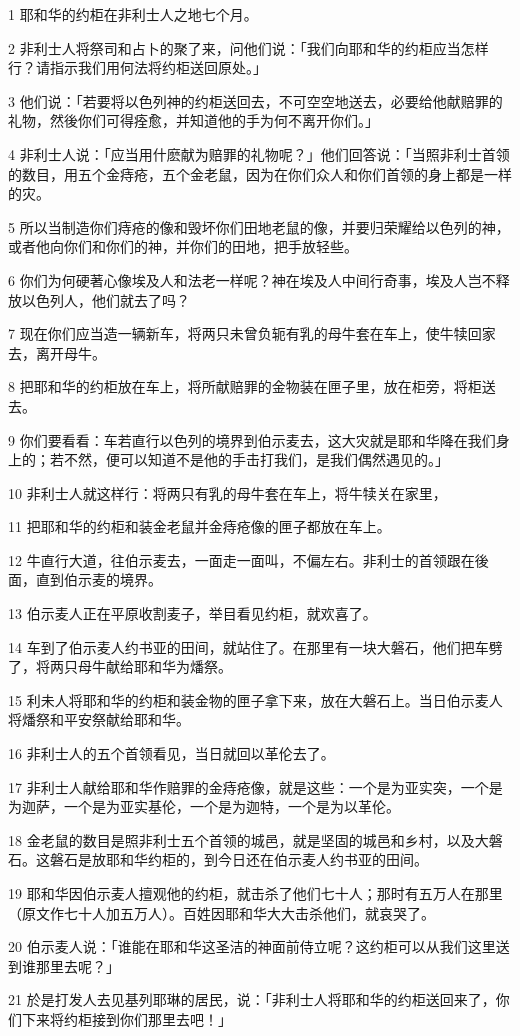 \par 1 耶和华的约柜在非利士人之地七个月。
\par 2 非利士人将祭司和占卜的聚了来，问他们说：「我们向耶和华的约柜应当怎样行？请指示我们用何法将约柜送回原处。」
\par 3 他们说：「若要将以色列神的约柜送回去，不可空空地送去，必要给他献赔罪的礼物，然後你们可得痊愈，并知道他的手为何不离开你们。」
\par 4 非利士人说：「应当用什麽献为赔罪的礼物呢？」他们回答说：「当照非利士首领的数目，用五个金痔疮，五个金老鼠，因为在你们众人和你们首领的身上都是一样的灾。
\par 5 所以当制造你们痔疮的像和毁坏你们田地老鼠的像，并要归荣耀给以色列的神，或者他向你们和你们的神，并你们的田地，把手放轻些。
\par 6 你们为何硬著心像埃及人和法老一样呢？神在埃及人中间行奇事，埃及人岂不释放以色列人，他们就去了吗？
\par 7 现在你们应当造一辆新车，将两只未曾负轭有乳的母牛套在车上，使牛犊回家去，离开母牛。
\par 8 把耶和华的约柜放在车上，将所献赔罪的金物装在匣子里，放在柜旁，将柜送去。
\par 9 你们要看看：车若直行以色列的境界到伯示麦去，这大灾就是耶和华降在我们身上的；若不然，便可以知道不是他的手击打我们，是我们偶然遇见的。」
\par 10 非利士人就这样行：将两只有乳的母牛套在车上，将牛犊关在家里，
\par 11 把耶和华的约柜和装金老鼠并金痔疮像的匣子都放在车上。
\par 12 牛直行大道，往伯示麦去，一面走一面叫，不偏左右。非利士的首领跟在後面，直到伯示麦的境界。
\par 13 伯示麦人正在平原收割麦子，举目看见约柜，就欢喜了。
\par 14 车到了伯示麦人约书亚的田间，就站住了。在那里有一块大磐石，他们把车劈了，将两只母牛献给耶和华为燔祭。
\par 15 利未人将耶和华的约柜和装金物的匣子拿下来，放在大磐石上。当日伯示麦人将燔祭和平安祭献给耶和华。
\par 16 非利士人的五个首领看见，当日就回以革伦去了。
\par 17 非利士人献给耶和华作赔罪的金痔疮像，就是这些：一个是为亚实突，一个是为迦萨，一个是为亚实基伦，一个是为迦特，一个是为以革伦。
\par 18 金老鼠的数目是照非利士五个首领的城邑，就是坚固的城邑和乡村，以及大磐石。这磐石是放耶和华约柜的，到今日还在伯示麦人约书亚的田间。
\par 19 耶和华因伯示麦人擅观他的约柜，就击杀了他们七十人；那时有五万人在那里（原文作七十人加五万人）。百姓因耶和华大大击杀他们，就哀哭了。
\par 20 伯示麦人说：「谁能在耶和华这圣洁的神面前侍立呢？这约柜可以从我们这里送到谁那里去呢？」
\par 21 於是打发人去见基列耶琳的居民，说：「非利士人将耶和华的约柜送回来了，你们下来将约柜接到你们那里去吧！」

